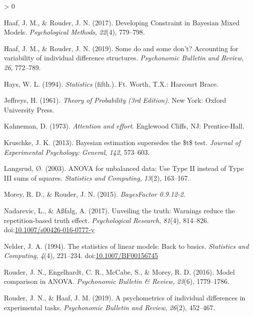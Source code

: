 \documentclass[
  english,
  ,man]{apa6}
\newlength{\cslhangindent}
\newenvironment{CSLReferences}[2] %
 {%
  \setlength{\parindent}{0pt}
  \ifodd #1 \everypar{\setlength{\hangindent}{\cslhangindent}}\ignorespaces\fi
  \ifnum #2 > 0
  \setlength{\parskip}{#2\baselineskip}
  \fi
 }%
 {}
\begin{document}
\begin{CSLReferences}{1}{0}
\leavevmode\hypertarget{ref-Haaf.Rouder.2017}{}%
Haaf, J. M., \& Rouder, J. N. (2017). Developing {Constraint} in {Bayesian Mixed Models}. \emph{Psychological Methods}, \emph{22}(4), 779--798.

\leavevmode\hypertarget{ref-Haaf.Rouder.2019}{}%
Haaf, J. M., \& Rouder, J. N. (2019). Some do and some don't? {Accounting} for variability of individual difference structures. \emph{Psychonomic Bulletin and Review}, \emph{26}, 772--789.

\leavevmode\hypertarget{ref-Hays.1994}{}%
Hays, W. L. (1994). \emph{Statistics} (fifth.). {Ft. Worth, T.X.}: {Harcourt Brace}.

\leavevmode\hypertarget{ref-Jeffreys.1961}{}%
Jeffreys, H. (1961). \emph{Theory of {Probability} (3rd {Edition})}. {New York}: {Oxford University Press}.

\leavevmode\hypertarget{ref-Kahneman.1973}{}%
Kahneman, D. (1973). \emph{Attention and effort}. {Englewood Cliffs, NJ}: {Prentice-Hall}.

\leavevmode\hypertarget{ref-Kruschke.2013}{}%
Kruschke, J. K. (2013). Bayesian estimation supersedes the \$t\$ test. \emph{Journal of Experimental Psychology: General}, \emph{142}, 573--603.

\leavevmode\hypertarget{ref-Langsrud.2003}{}%
Langsrud, Ø. (2003). {ANOVA} for unbalanced data: {Use Type II} instead of {Type III} sums of squares. \emph{Statistics and Computing}, \emph{13}(2), 163--167.

\leavevmode\hypertarget{ref-Morey.Rouder.2015}{}%
Morey, R. D., \& Rouder, J. N. (2015). \emph{{BayesFactor} 0.9.12-2}.

\leavevmode\hypertarget{ref-nadarevic2017}{}%
Nadarevic, L., \& Aßfalg, A. (2017). Unveiling the truth: Warnings reduce the repetition-based truth effect. \emph{Psychological Research}, \emph{81}(4), 814--826. doi:\href{https://doi.org/10.1007/s00426-016-0777-y}{10.1007/s00426-016-0777-y}

\leavevmode\hypertarget{ref-Nelder.1994}{}%
Nelder, J. A. (1994). The statistics of linear models: Back to basics. \emph{Statistics and Computing}, \emph{4}(4), 221--234. doi:\href{https://doi.org/10.1007/BF00156745}{10.1007/BF00156745}

\leavevmode\hypertarget{ref-Rouder.etal.2016}{}%
Rouder, J. N., Engelhardt, C. R., McCabe, S., \& Morey, R. D. (2016). Model comparison in {ANOVA}. \emph{Psychonomic Bulletin \& Review}, \emph{23}(6), 1779--1786.

\leavevmode\hypertarget{ref-Rouder.Haaf.2019}{}%
Rouder, J. N., \& Haaf, J. M. (2019). A psychometrics of individual differences in experimental tasks. \emph{Psychonomic Bulletin and Review}, \emph{26}(2), 452--467.


\end{CSLReferences}
\end{document}
